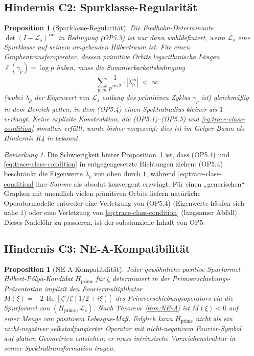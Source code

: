 \documentclass[11pt]{article}
\newtheorem{proposition}[theorem]{Proposition}
\theoremstyle{definition}
\theoremstyle{remark}
\newtheorem{remark}[theorem]{Bemerkung}
\renewcommand{\Re}{\operatorname{Re}}
\begin{document}
\subsection{Hindernis C2: Spurklasse-Regularität}
\label{sec:obs-C2}

\begin{proposition}[Spurklasse-Regularität]\label{prop:trace-class}
Die Fredholm-Determinante $\det(I - \mathcal{L}_s)^{\mathrm{vac}}$ in
Bedingung (OP5.3) ist nur dann wohldefiniert, wenn $\mathcal{L}_s$ eine
Spurklasse auf seinem umgebenden Hilbertraum ist. Für einen Graphentransferoperator,
dessen primitive Orbits logarithmische Längen
$\ell(\gamma_p) = \log p$ haben, muss die Summierbarkeitsbedingung
\begin{equation}
\label{eq:trace-class-condition}
  \sum_{p,m} \frac{1}{p^{m/2}} \cdot |\lambda_p^m|
  \;<\; \infty
\end{equation}
(wobei $\lambda_p$ der Eigenwert von $\mathcal{L}_s$ entlang des primitiven
Zyklus $\gamma_p$ ist) gleichmäßig in dem Bereich gelten, in dem (OP5.4)
einen Spektralradius kleiner als $1$ verlangt. Keine explizite Konstruktion,
die (OP5.1)--(OP5.5) und
\eqref{eq:trace-class-condition} simultan erfüllt, wurde bisher vorgezeigt; dies ist
im Geiger-Baum als Hindernis K4 in \cite{Geiger2026RHI} bekannt.
\end{proposition}

\begin{remark}\label{rem:trace-class-connection}
Die Schwierigkeit hinter Proposition~\ref{prop:trace-class} ist, dass
(OP5.4) und \eqref{eq:trace-class-condition} in entgegengesetzte
Richtungen ziehen: (OP5.4) beschränkt die Eigenwerte $\lambda_p$ von oben
durch $1$, während \eqref{eq:trace-class-condition} ihre
\emph{Summe} als absolut konvergent erzwingt. Für einen „generischen“ Graphen
mit unendlich vielen primitiven Orbits liefern natürliche Operatormodelle entweder
eine Verletzung von (OP5.4) (Eigenwerte häufen sich nahe $1$) oder
eine Verletzung von \eqref{eq:trace-class-condition} (langsamer Abfall). Dieses
Nadelöhr zu passieren, ist der substanzielle Inhalt von OP5.
\end{remark}

\subsection{Hindernis C3: NE-A-Kompatibilität}
\label{sec:obs-C3}

\begin{proposition}[NE-A-Kompatibilität]\label{prop:ne-a-compat}
Jeder gewöhnliche positive Spurformel-Hilbert-P\'olya-Kandidat
$H_\mathrm{prime}$ für $\zeta$ determiniert in der Primverschiebungs-Präsentation
implizit den Fouriermultiplikator
$M(\xi) = -2\,\Re[\zeta'/\zeta(1/2 + i\xi)]$ des Primverschiebungsoperators
via die Spurformel von $(H_\mathrm{prime}, \mathcal{L}_s)$.
Nach Theorem~\ref{thm:NE-A} ist $M(\xi) < 0$ auf einer Menge von positivem
Lebesgue-Maß. Folglich kann $H_\mathrm{prime}$ nicht als ein
nicht-negativer selbstadjungierter Operator mit nicht-negativem Fourier-Symbol
auf glatten Geometrien entstehen; er muss intrinsische Vorzeichenstruktur
in seiner Spektraltransformation tragen.
\end{proposition}
\end{document}
